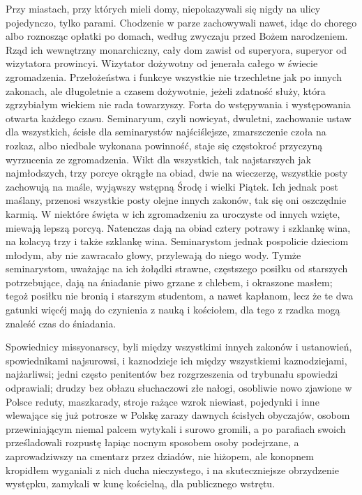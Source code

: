 \documentclass{book}
\begin{document}
Przy miastach, przy których mieli domy, niepokazywali się nigdy na ulicy pojedynczo, tylko parami. Chodzenie w parze zachowywali nawet, idąc do chorego albo roznosząc opłatki po domach, według zwyczaju przed Bożem narodzeniem. Rząd ich wewnętrzny monarchiczny, cały dom zawisł od superyora, superyor od wizytatora prowincyi. Wizytator dożywotny od jenerała całego w świecie zgromadzenia. Przełożeństwa i funkcye wszystkie nie trzechletne jak po innych zakonach, ale długoletnie a czasem dożywotnie, jeżeli zdatność służy, która zgrzybiałym wiekiem nie rada towarzyszy. Forta do wstępywania i występowania otwarta każdego czasu. Seminaryum, czyli nowicyat, dwuletni, zachowanie ustaw dla wszystkich, ścisłe dla seminarystów najściślejsze, zmarszczenie czoła na rozkaz, albo niedbale wykonana powinność, staje się częstokroć przyczyną wyrzucenia ze zgromadzenia. Wikt dla wszystkich, tak najstarszych jak najmłodszych, trzy porcye okrągłe na obiad, dwie na wieczerzę, wszystkie posty zachowują na maśle, wyjąwszy wstępną Środę i wielki Piątek. Ich jednak post maślany, przenosi wszystkie posty olejne innych zakonów, tak się oni oszczędnie karmią. W niektóre święta w ich zgromadzeniu za uroczyste od innych wzięte, miewają lepszą porcyą. Natenczas dają na obiad cztery potrawy i szklankę wina, na kolacyą trzy i także szklankę wina. Seminarystom jednak pospolicie dzieciom młodym, aby nie zawracało głowy, przylewają do niego wody. Tymże seminarystom, uważając na ich żołądki strawne, częstszego posiłku od starszych potrzebujące, dają na śniadanie piwo grzane z chlebem, i okraszone masłem; tegoż posiłku nie bronią i starszym studentom, a nawet kapłanom, lecz że te dwa gatunki więcéj mają do czynienia z nauką i kościołem, dla tego z rzadka mogą znaleść czas do śniadania.

Spowiednicy missyonarscy, byli między wszystkimi innych zakonów i ustanowień, spowiednikami najsurowsi, i kaznodzieje ich między wszystkiemi kaznodziejami, najżarliwsi; jedni często penitentów bez rozgrzeszenia od trybunału spowiedzi odprawiali; drudzy bez obłazu słuchaczowi złe nałogi, osobliwie nowo zjawione w Polsce reduty, maszkarady, stroje rażące wzrok niewiast, pojedynki i inne wlewające się już potrosze w Polskę zarazy dawnych ścisłych obyczajów, osobom przewiniającym niemal palcem wytykali i surowo gromili, a po parafiach swoich prześladowali rozpustę łapiąc nocnym sposobem osoby podejrzane, a zaprowadziwszy na cmentarz przez dziadów, nie hiżopem, ale konopnem kropidłem wyganiali z nich ducha nieczystego, i na skuteczniejsze obrzydzenie występku, zamykali w kunę kościelną, dla publicznego wstrętu.
\end{document}
